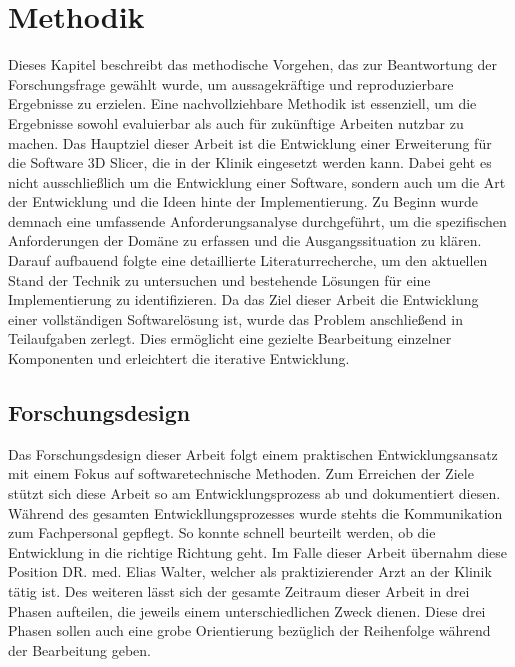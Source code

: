 \chapter{Methodik}
\label{chap:methodik} Dieses Kapitel beschreibt das methodische Vorgehen, das
zur Beantwortung der Forschungsfrage gewählt wurde, um aussagekräftige und reproduzierbare
Ergebnisse zu erzielen. Eine nachvollziehbare Methodik ist essenziell, um die Ergebnisse
sowohl evaluierbar als auch für zukünftige Arbeiten nutzbar zu machen. Das
Hauptziel dieser Arbeit ist die Entwicklung einer Erweiterung für die Software
3D Slicer, die in der Klinik eingesetzt werden kann. Dabei geht es nicht
ausschließlich um die Entwicklung einer Software, sondern auch um die Art der Entwicklung
und die Ideen hinte der Implementierung. Zu Beginn wurde demnach eine umfassende
Anforderungsanalyse durchgeführt, um die spezifischen Anforderungen der Domäne zu
erfassen und die Ausgangssituation zu klären. Darauf aufbauend folgte eine
detaillierte Literaturrecherche, um den aktuellen Stand der Technik zu untersuchen
und bestehende Lösungen für eine Implementierung zu identifizieren. Da das Ziel
dieser Arbeit die Entwicklung einer vollständigen Softwarelösung ist, wurde das Problem
anschließend in Teilaufgaben zerlegt. Dies ermöglicht eine gezielte Bearbeitung
einzelner Komponenten und erleichtert die iterative Entwicklung.

\section{Forschungsdesign}
Das Forschungsdesign dieser Arbeit folgt einem praktischen Entwicklungsansatz
mit einem Fokus auf softwaretechnische Methoden. Zum Erreichen der Ziele stützt sich
diese Arbeit so am Entwicklungsprozess ab und dokumentiert diesen. Während des
gesamten Entwickllungsprozesses wurde stehts die Kommunikation zum Fachpersonal
gepflegt. So konnte schnell beurteilt werden, ob die Entwicklung in die richtige
Richtung geht. Im Falle dieser Arbeit übernahm diese Position DR. med. Elias Walter,
welcher als praktizierender Arzt an der Klinik tätig ist. Des weiteren lässt sich
der gesamte Zeitraum dieser Arbeit in drei Phasen aufteilen, die jeweils einem
unterschiedlichen Zweck dienen. Diese drei Phasen sollen auch eine grobe Orientierung
bezüglich der Reihenfolge während der Bearbeitung geben.
\pagebreak


